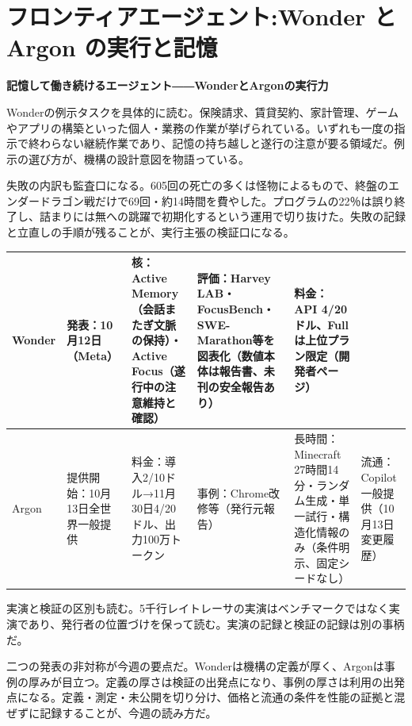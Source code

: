 \documentclass[lualatex,a4paper,10pt]{jlreq}
\begin{document}
\surveycover
\clearpage
\twocolumn
\section{フロンティアエージェント:Wonder と Argon の実行と記憶}
\label{sec:P1}
{\Large\bfseries 記憶して働き続けるエージェント――WonderとArgonの実行力\par}
\bigskip
Wonderの例示タスクを具体的に読む。保険請求、賃貸契約、家計管理、ゲームやアプリの構築といった個人・業務の作業が挙げられている。いずれも一度の指示で終わらない継続作業であり、記憶の持ち越しと遂行の注意が要る領域だ。例示の選び方が、機構の設計意図を物語っている。
\cite{B01,B62,B63,B02,B64,B03}

失敗の内訳も監査口になる。605回の死亡の多くは怪物によるもので、終盤のエンダードラゴン戦だけで69回・約14時間を費やした。プログラムの22％は誤り終了し、詰まりには無への跳躍で初期化するという運用で切り抜けた。失敗の記録と立直しの手順が残ることが、実行主張の検証口になる。
\cite{B05,B65,B08,B04,B07,B06}

\begin{strip}
\centering\footnotesize
{}
\begin{tabularx}{0.96\linewidth}{@{}lXXXXX@{}}
\toprule
Wonder & 発表：10月12日（Meta） & 核：Active Memory（会話またぎ文脈の保持）・Active Focus（遂行中の注意維持と確認） & 評価：Harvey LAB・FocusBench・SWE-Marathon等を図表化（数値本体は報告書、未刊の安全報告あり） & 料金：API 4/20ドル、Fullは上位プラン限定（開発者ページ） \cite{B01,B62,B63,B02} \\
\midrule
Argon & 提供開始：10月13日全世界一般提供 & 料金：導入2/10ドル→11月30日4/20ドル、出力100万トークン & 事例：Chrome改修等（発行元報告） & 長時間：Minecraft 27時間14分・ランダム生成・単一試行・構造化情報のみ（条件明示、固定シードなし） & 流通：Copilot一般提供（10月13日変更履歴） \cite{B05,B65,B08,B04} \\
\bottomrule
\end{tabularx}
\end{strip}

実演と検証の区別も読む。5千行レイトレーサの実演はベンチマークではなく実演であり、発行者の位置づけを保って読む。実演の記録と検証の記録は別の事柄だ。
\cite{B05,B65,B08,B04,B07,B06}

二つの発表の非対称が今週の要点だ。Wonderは機構の定義が厚く、Argonは事例の厚みが目立つ。定義の厚さは検証の出発点になり、事例の厚さは利用の出発点になる。定義・測定・未公開を切り分け、価格と流通の条件を性能の証拠と混ぜずに記録することが、今週の読み方だ。
\cite{B01,B62,B63,B02,B64,B03,B05,B65,B08,B04,B07,B06}
\end{document}
